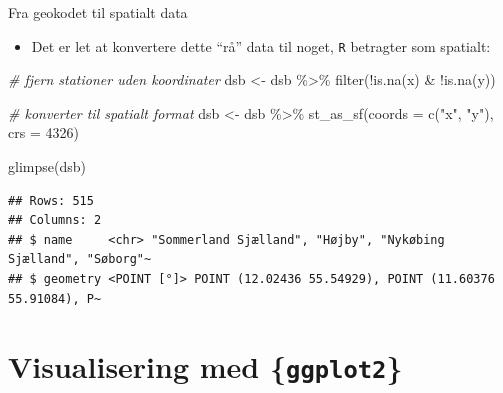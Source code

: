 \documentclass[
  8pt,
  ignorenonframetext,
  aspectratio=169]{beamer}
\newenvironment{Shaded}{}{}
\newcommand{\AttributeTok}[1]{\textcolor[rgb]{0.49,0.56,0.16}{#1}}
\newcommand{\CommentTok}[1]{\textcolor[rgb]{0.38,0.63,0.69}{\textit{#1}}}
\newcommand{\DecValTok}[1]{\textcolor[rgb]{0.25,0.63,0.44}{#1}}
\newcommand{\FunctionTok}[1]{\textcolor[rgb]{0.02,0.16,0.49}{#1}}
\newcommand{\NormalTok}[1]{#1}
\newcommand{\OtherTok}[1]{\textcolor[rgb]{0.00,0.44,0.13}{#1}}
\newcommand{\SpecialCharTok}[1]{\textcolor[rgb]{0.25,0.44,0.63}{#1}}
\newcommand{\StringTok}[1]{\textcolor[rgb]{0.25,0.44,0.63}{#1}}
\providecommand{\tightlist}{%
  \setlength{\itemsep}{0pt}\setlength{\parskip}{0pt}}
\begin{document}
\begin{frame}[fragile]{Fra geokodet til spatialt data}
\protect\hypertarget{fra-geokodet-til-spatialt-data-1}{}
\begin{itemize}
\tightlist
\item
  Det er let at konvertere dette ``rå'' data til noget, \texttt{R}
  betragter som spatialt:
\end{itemize}

\tiny

\begin{Shaded}
\begin{Highlighting}[]
\CommentTok{\# fjern stationer uden koordinater}
\NormalTok{dsb }\OtherTok{\textless{}{-}}\NormalTok{ dsb }\SpecialCharTok{\%\textgreater{}\%} 
  \FunctionTok{filter}\NormalTok{(}\SpecialCharTok{!}\FunctionTok{is.na}\NormalTok{(x) }\SpecialCharTok{\&} \SpecialCharTok{!}\FunctionTok{is.na}\NormalTok{(y))}

\CommentTok{\# konverter til spatialt format}
\NormalTok{dsb }\OtherTok{\textless{}{-}}\NormalTok{ dsb }\SpecialCharTok{\%\textgreater{}\%} 
  \FunctionTok{st\_as\_sf}\NormalTok{(}\AttributeTok{coords =} \FunctionTok{c}\NormalTok{(}\StringTok{"x"}\NormalTok{, }\StringTok{"y"}\NormalTok{),}
           \AttributeTok{crs =} \DecValTok{4326}\NormalTok{)}

\FunctionTok{glimpse}\NormalTok{(dsb)}
\end{Highlighting}
\end{Shaded}

\begin{verbatim}
## Rows: 515
## Columns: 2
## $ name     <chr> "Sommerland Sjælland", "Højby", "Nykøbing Sjælland", "Søborg"~
## $ geometry <POINT [°]> POINT (12.02436 55.54929), POINT (11.60376 55.91084), P~
\end{verbatim}

\normalsize
\end{frame}

\hypertarget{visualisering-med-ggplot2}{%
\section{\texorpdfstring{Visualisering med
\{\texttt{ggplot2}\}}{Visualisering med \{ggplot2\}}}\label{visualisering-med-ggplot2}}
\end{document}
